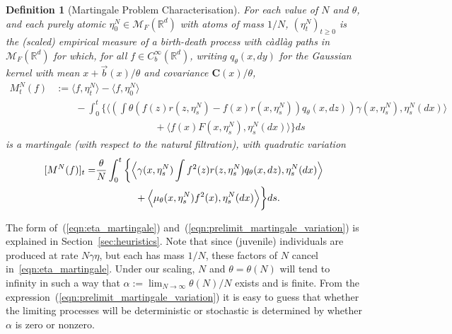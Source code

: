 \documentclass[12pt]{article}
\newtheorem{definition}[theorem]{Definition}
\newcommand{\IR}{\mathbb R}
\newcommand{\meanq}{\vec b}    %
\newcommand{\covq}{\mathbf{C}}     %
\newcommand{\measures}{\mathcal{M}_F(\IR^d)} %
\numberwithin{equation}{section}
\begin{document}
\begin{definition}[Martingale Problem Characterisation]
    \label{defn:mgale_construction}
	For each value of $N$ and $\theta$, and each purely atomic 
$\eta_0^N\in\measures$ with atoms of mass $1/N$,
$(\eta^N_t)_{t \geq 0}$ is the (scaled) empirical measure of a birth-death 
process with c\`adl\`ag paths in $\measures$ for which,
for all $f \in C^{\infty}_{b}(\IR^d)$,
writing $q_\theta(x, dy)$ for the Gaussian kernel
with mean $x + \meanq(x)/\theta$ and covariance $\covq(x) / \theta$,
\begin{equation}
    \label{eqn:eta_martingale}
\begin{aligned}
M^N_t(f)
&:=  \langle f, \eta^N_t \rangle
        -\langle f, \eta^N_0 \rangle
 \\ &\qquad {}
 -  \int_{0}^{t}\bigg\{
        \bigg\langle \left( \int \theta
             \left(
                f(z)r(z, \eta^N_{s})
                - f(x)r(x, \eta^N_{s})
            \right)
        q_\theta(x,dz) \right)
         \gamma(x, \eta^N_{s}), \eta^N_{s}(dx) \bigg\rangle
\\ & \qquad \qquad \qquad \qquad \qquad {}
    + \bigg\langle f(x) F(x, \eta^N_{s}),
    \eta^N_{s}(dx) \bigg\rangle
    \bigg\} ds
\end{aligned}    
\end{equation}
is a martingale (with respect to the natural filtration), 
with quadratic variation
    \begin{equation} \label{eqn:prelimit_martingale_variation}
\begin{aligned} \relax
[ M^N(f)]_t =& 
\frac{\theta}{N} \int_{0}^{t}\bigg\{
    \Big\langle \gamma(x, \eta^N_{s})
        \int f^2(z)r(z, \eta^N_{s}) q_\theta(x,dz) 
    , \eta^N_{s}(dx) \Big\rangle \\
& \qquad \qquad {}
    + \Big\langle \mu_\theta(x, \eta^N_{s}) f^2(x) 
    , \eta^N_{s}(dx)\Big\rangle
    \bigg\}ds. 
\end{aligned}    
\end{equation}
\end{definition}
The form of~(\ref{eqn:eta_martingale}) and~(\ref{eqn:prelimit_martingale_variation})
is explained in Section~\ref{sec:heuristics}.
Note that since (juvenile) individuals are produced at rate $N \gamma \eta$, but each
has mass $1/N$,
these factors of $N$ cancel in~\eqref{eqn:eta_martingale}. 
Under our scaling, $N$ and $\theta=\theta(N)$ will tend to infinity in such a 
way that $\alpha:=\lim_{N\to\infty}\theta(N)/N$ exists and is finite.
From the expression~(\ref{eqn:prelimit_martingale_variation}) it is easy to guess that 
whether the limiting processes will be deterministic or stochastic
is determined by whether $\alpha$ is zero or nonzero.
\end{document}

